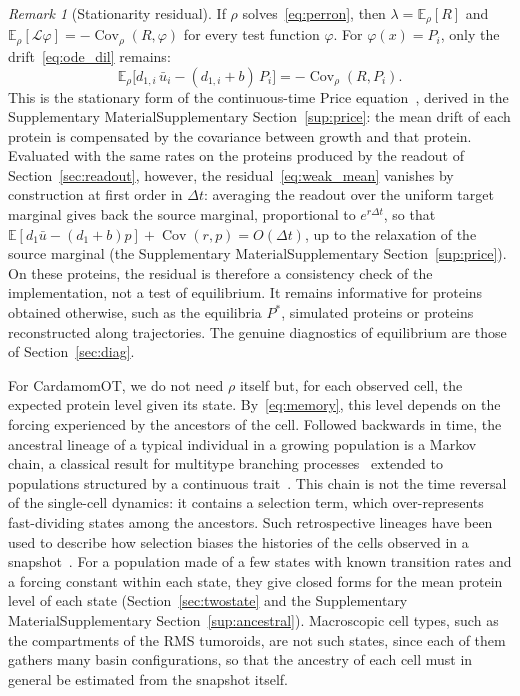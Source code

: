 \documentclass[a4paper, 11pt]{article}
\DeclareMathOperator{\Cov}{Cov}
\newcommand{\E}{\mathbb{E}}
\newcommand{\supref}[1]{\ifsimplified the Supplementary Material\else Supplementary Section~\ref{#1}\fi}
\theoremstyle{plain}
\theoremstyle{remark}
\newtheorem{rem}{Remark}
\begin{document}
\begin{rem}[Stationarity residual]\label{rem:weak}
If $\rho$ solves~\eqref{eq:perron}, then $\lambda = \E_\rho[R]$ and $\E_\rho[\mathcal{L}\varphi] = -\Cov_\rho(R,\varphi)$ for every test function $\varphi$. For $\varphi(x) = P_i$, only the drift~\eqref{eq:ode_dil} remains:
\begin{equation}\label{eq:weak_mean}
\E_\rho\bigl[d_{1,i}\,\bar u_i - (d_{1,i} + b)\,P_i\bigr] = -\Cov_\rho(R, P_i).
\end{equation}
This is the stationary form of the continuous-time Price equation~\cite{price1970selection, frank2012price}, derived in \supref{sup:price}: the mean drift of each protein is compensated by the covariance between growth and that protein. Evaluated with the same rates on the proteins produced by the readout of Section~\ref{sec:readout}, however, the residual~\eqref{eq:weak_mean} vanishes by construction at first order in $\Delta t$: averaging the readout over the uniform target marginal gives back the source marginal, proportional to $e^{r\Delta t}$, so that $\E[d_1\bar u - (d_1 + b)p] + \Cov(r, p) = O(\Delta t)$, up to the relaxation of the source marginal (\supref{sup:price}). On these proteins, the residual is therefore a consistency check of the implementation, not a test of equilibrium. It remains informative for proteins obtained otherwise, such as the equilibria $P^\ast$, simulated proteins or proteins reconstructed along trajectories. The genuine diagnostics of equilibrium are those of Section~\ref{sec:diag}.
\end{rem}

For CardamomOT, we do not need $\rho$ itself but, for each observed cell, the expected protein level given its state. By~\eqref{eq:memory}, this level depends on the forcing experienced by the ancestors of the cell. Followed backwards in time, the ancestral lineage of a typical individual in a growing population is a Markov chain, a classical result for multitype branching processes~\cite{jagers1989general, jagers1996asymptotic, georgii2003ancestral} extended to populations structured by a continuous trait~\cite{marguet2019uniform}. This chain is not the time reversal of the single-cell dynamics: it contains a selection term, which over-represents fast-dividing states among the ancestors. Such retrospective lineages have been used to describe how selection biases the histories of the cells observed in a snapshot~\cite{leibler2010individual, thomas2017snapshot, nozoe2017inferring}. For a population made of a few states with known transition rates and a forcing constant within each state, they give closed forms for the mean protein level of each state (Section~\ref{sec:twostate} and \supref{sup:ancestral}). Macroscopic cell types, such as the compartments of the RMS tumoroids, are not such states, since each of them gathers many basin configurations, so that the ancestry of each cell must in general be estimated from the snapshot itself.
\end{document}
